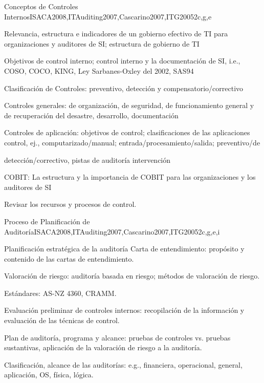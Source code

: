 \begin{syllabus}
	\begin{unit}{Conceptos de Controles Internos}{}{ISACA2008,ITAuditing2007,Cascarino2007,ITG2005}{2}{c,g,e}
	\begin{topics}
	\item Relevancia, estructura e indicadores de un gobierno efectivo de TI para organizaciones y auditores de SI; estructura de gobierno de TI
	\item Objetivos de control interno; control interno y la documentación de SI, i.e., COSO, COCO, KING, Ley Sarbanes-Oxley del 2002, SAS94
	\item Clasificación de Controles: preventivo, detección y compensatorio/correctivo 
	\item Controles generales: de organización, de seguridad, de funcionamiento general y de recuperación del desastre, desarrollo, documentación
	\item Controles de aplicación: objetivos de control; clasificaciones de las aplicaciones control, ej., computarizado/manual; entrada/procesamiento/salida; preventivo/de \item detección/correctivo, pistas de auditoría intervención
	\item COBIT: La estructura y la importancia de COBIT para las organizaciones y los auditores de SI
	\end{topics}
	
	\begin{learningoutcomes}
	\item Revisar los recursos y procesos de control.
	\end{learningoutcomes}
	\end{unit}
	
	\begin{unit}{Proceso de Planificación de Auditoría}{}{ISACA2008,ITAuditing2007,Cascarino2007,ITG2005}{2}{c,g,e,i}
	\begin{topics}
	\item Planificación estratégica de la auditoría Carta de entendimiento: propósito y contenido de las cartas de entendimiento.
	\item Valoración de riesgo: auditoría basada en riesgo; métodos de valoración de riesgo.
	\item Estándares: AS-NZ 4360, CRAMM.
	\item Evaluación preliminar de controles internos: recopilación de la información y evaluación de las técnicas de control.
	\item Plan de auditoría, programa y alcance: pruebas de controles vs. pruebas sustantivas, aplicación de la valoración de riesgo a la auditoría.
	\item Clasificación, alcance de las auditorías: e.g., financiera, operacional, general, aplicación, OS, física, lógica.
	\end{topics}
	

\end{unit}
\end{syllabus}
